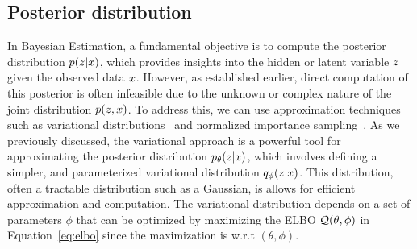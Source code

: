 \subsection{Posterior distribution}
\label{sub:posterior_distribution}

In Bayesian Estimation, a fundamental objective is to compute the posterior
distribution $p(z|x)$, which provides insights into the hidden or latent
variable $z$ given the observed data $x$. 
However, as established earlier, direct
computation of this posterior is often infeasible due to the unknown or complex
nature of the joint distribution $p(z,x)$.
To address this, we can use approximation techniques such as
variational distributions~\citep{Blei_2017} and normalized importance 
sampling~\citep{doucet2001introduction}.
As we previously discussed, the variational approach is a powerful tool for
approximating the posterior distribution 
$p_{\theta}(z|x)$, which  involves defining a simpler, 
and parameterized variational distribution $q_\phi(z|x)$. 
This distribution, often a tractable distribution such as a Gaussian, is
allows for efficient approximation and computation. 
The variational distribution depends on a set of parameters $\phi$ that can be
optimized by maximizing the ELBO $\mathcal{Q}(\theta,\phi)$ in 
Equation~\eqref{eq:elbo} since the maximization
is w.r.t  $(\theta, \phi)$.


